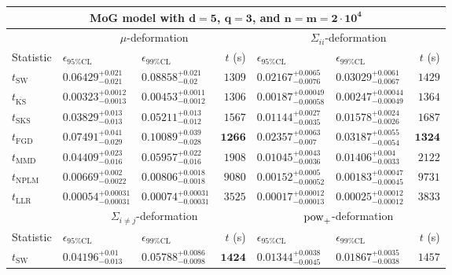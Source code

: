 \begin{tabular}{l|llr|llr}
	\toprule
	\multicolumn{7}{c}{{\bf MoG model with $\mathbf{d=5}$, $\mathbf{q=3}$, and $\mathbf{n=m=2\cdot 10^{4}}$}} \\
	\toprule
	\multicolumn{1}{c}{} & \multicolumn{3}{c}{$\mu$-deformation} & \multicolumn{3}{c}{$\Sigma_{ii}$-deformation} \\
	Statistic & $\epsilon_{95\%\mathrm{CL}}$ & $\epsilon_{99\%\mathrm{CL}}$ & $t$ (s) & $\epsilon_{95\%\mathrm{CL}}$ & $\epsilon_{99\%\mathrm{CL}}$ & $t$ (s) \\
	\midrule
	$t_{\mathrm{SW}}$ & $0.06429_{-0.021}^{+0.021}$ & $0.08858_{-0.02}^{+0.021}$ & $1309$ & $0.02167_{-0.0076}^{+0.0065}$ & $0.03029_{-0.0067}^{+0.0061}$ & $1429$ \\
	$t_{\overline{\mathrm{KS}}}$ & ${\mathbf{0.00323_{-0.0013}^{+0.0012}}}$ & ${\mathbf{0.00453_{-0.0012}^{+0.0011}}}$ & $1306$ & ${\mathbf{0.00187_{-0.00058}^{+0.00049}}}$ & ${\mathbf{0.00247_{-0.00049}^{+0.00044}}}$ & $1364$ \\
	$t_{\mathrm{SKS}}$ & $0.03829_{-0.013}^{+0.013}$ & $0.05211_{-0.012}^{+0.013}$ & $1567$ & $0.01144_{-0.0035}^{+0.0027}$ & $0.01578_{-0.0026}^{+0.0024}$ & $1687$ \\
	$t_{\mathrm{FGD}}$ & $0.07491_{-0.029}^{+0.041}$ & $0.10089_{-0.028}^{+0.039}$ & ${\mathbf{1266}}$ & $0.02357_{-0.007}^{+0.0063}$ & $0.03187_{-0.0054}^{+0.0055}$ & ${\mathbf{1324}}$ \\
	$t_{\mathrm{MMD}}$ & $0.04409_{-0.016}^{+0.023}$ & $0.05957_{-0.016}^{+0.022}$ & $1908$ & $0.01045_{-0.0036}^{+0.0043}$ & $0.01406_{-0.0033}^{+0.004}$ & $2122$ \\
\rowcolor{red!35}	$t_{\mathrm{NPLM}}$ & $0.00669_{-0.0022}^{+0.002}$ & $0.00806_{-0.0018}^{+0.0018}$ & $9080$ & $0.00152_{-0.00052}^{+0.0005}$ & $0.00183_{-0.00045}^{+0.00047}$ & $9731$ \\
	$t_{\mathrm{LLR}}$ & $0.00054_{-0.00031}^{+0.00031}$ & $0.00074_{-0.00031}^{+0.00031}$ & $3525$ & $0.00017_{-0.00013}^{+0.00012}$ & $0.00025_{-0.00012}^{+0.00012}$ & $3833$ \\
	\toprule
	\multicolumn{1}{c}{} & \multicolumn{3}{c}{$\Sigma_{i\neq j}$-deformation} & \multicolumn{3}{c}{$\rm{pow}_{+}$-deformation} \\
	Statistic & $\epsilon_{95\%\mathrm{CL}}$ & $\epsilon_{99\%\mathrm{CL}}$ & $t$ (s) & $\epsilon_{95\%\mathrm{CL}}$ & $\epsilon_{99\%\mathrm{CL}}$ & $t$ (s) \\
	\midrule
	$t_{\mathrm{SW}}$ & $0.04196_{-0.013}^{+0.01}$ & $0.05788_{-0.0098}^{+0.0086}$ & ${\mathbf{1424}}$ & $0.01344_{-0.0045}^{+0.0038}$ & $0.01867_{-0.0038}^{+0.0035}$ & $1457$ \\

\end{tabular}
